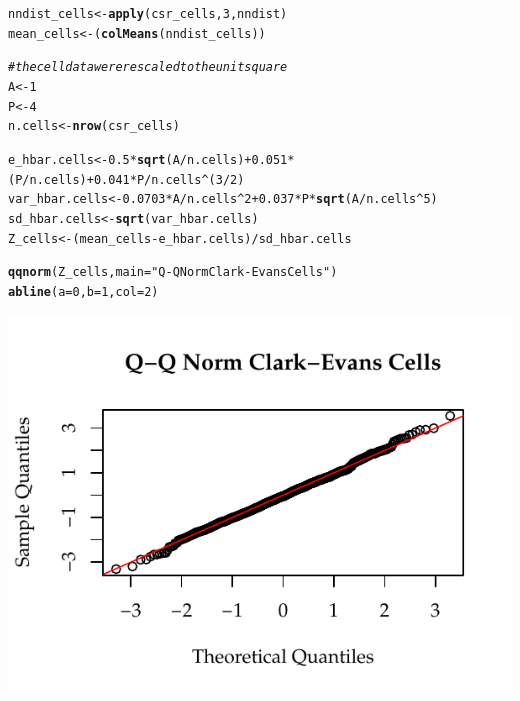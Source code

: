 \documentclass{article}\usepackage[]{graphicx}\usepackage[]{color}
\makeatletter
\def\maxwidth{ %
  \ifdim\Gin@nat@width>\linewidth
    \linewidth
  \else
    \Gin@nat@width
  \fi
}
\newcommand{\hlnum}[1]{\textcolor[rgb]{0.686,0.059,0.569}{#1}}%
\newcommand{\hlstr}[1]{\textcolor[rgb]{0.192,0.494,0.8}{#1}}%
\newcommand{\hlcom}[1]{\textcolor[rgb]{0.678,0.584,0.686}{\textit{#1}}}%
\newcommand{\hlopt}[1]{\textcolor[rgb]{0,0,0}{#1}}%
\newcommand{\hlstd}[1]{\textcolor[rgb]{0.345,0.345,0.345}{#1}}%
\newcommand{\hlkwb}[1]{\textcolor[rgb]{0.69,0.353,0.396}{#1}}%
\newcommand{\hlkwc}[1]{\textcolor[rgb]{0.333,0.667,0.333}{#1}}%
\newcommand{\hlkwd}[1]{\textcolor[rgb]{0.737,0.353,0.396}{\textbf{#1}}}%
\newenvironment{kframe}{%
 \def\at@end@of@kframe{}%
 \ifinner\ifhmode%
  \def\at@end@of@kframe{\end{minipage}}%
  \begin{minipage}{\columnwidth}%
 \fi\fi%
 \def\FrameCommand##1{\hskip\@totalleftmargin \hskip-\fboxsep
 \colorbox{shadecolor}{##1}\hskip-\fboxsep
     \hskip-\linewidth \hskip-\@totalleftmargin \hskip\columnwidth}%
 \MakeFramed {\advance\hsize-\width
   \@totalleftmargin\z@ \linewidth\hsize
   \@setminipage}}%
 {\par\unskip\endMakeFramed%
 \at@end@of@kframe}
\newenvironment{knitrout}{}{} %
\makeatother
\begin{document}
\begin{enumerate}
\begin{enumerate}
\begin{knitrout}
\begin{kframe}
\begin{alltt}
\hlstd{nndist_cells} \hlkwb{<-} \hlkwd{apply}\hlstd{(csr_cells,}\hlnum{3}\hlstd{,nndist)}
\hlstd{mean_cells} \hlkwb{<-} \hlstd{(}\hlkwd{colMeans}\hlstd{(nndist_cells))}

\hlcom{# the cell data were rescaled to the unit square}
\hlstd{A} \hlkwb{<-} \hlnum{1}
\hlstd{P} \hlkwb{<-} \hlnum{4}
\hlstd{n.cells} \hlkwb{<-} \hlkwd{nrow}\hlstd{(csr_cells)}

\hlstd{e_hbar.cells} \hlkwb{<-} \hlnum{0.5}\hlopt{*}\hlkwd{sqrt}\hlstd{(A}\hlopt{/}\hlstd{n.cells)} \hlopt{+} \hlnum{0.051}\hlopt{*}\hlstd{(P}\hlopt{/}\hlstd{n.cells)} \hlopt{+} \hlnum{0.041}\hlopt{*}\hlstd{P}\hlopt{/}\hlstd{n.cells}\hlopt{^}\hlstd{(}\hlnum{3}\hlopt{/}\hlnum{2}\hlstd{)}
\hlstd{var_hbar.cells} \hlkwb{<-} \hlnum{0.0703}\hlopt{*}\hlstd{A}\hlopt{/}\hlstd{n.cells}\hlopt{^}\hlnum{2} \hlopt{+} \hlnum{0.037}\hlopt{*}\hlstd{P}\hlopt{*}\hlkwd{sqrt}\hlstd{(A}\hlopt{/}\hlstd{n.cells}\hlopt{^}\hlnum{5}\hlstd{)}
\hlstd{sd_hbar.cells} \hlkwb{<-} \hlkwd{sqrt}\hlstd{(var_hbar.cells)}
\hlstd{Z_cells} \hlkwb{<-} \hlstd{(mean_cells} \hlopt{-} \hlstd{e_hbar.cells)}\hlopt{/}\hlstd{sd_hbar.cells}

\hlkwd{qqnorm}\hlstd{(Z_cells,} \hlkwc{main} \hlstd{=} \hlstr{"Q-Q Norm Clark-Evans Cells"}\hlstd{)}
\hlkwd{abline}\hlstd{(}\hlkwc{a}\hlstd{=}\hlnum{0}\hlstd{,}\hlkwc{b}\hlstd{=}\hlnum{1}\hlstd{,}\hlkwc{col}\hlstd{=}\hlnum{2}\hlstd{)}
\end{alltt}
\end{kframe}

{\centering \includegraphics[width=\maxwidth]{figure/prob2g_cells-1} 

}




\end{knitrout}
\end{enumerate}
\end{enumerate}
\end{document}
